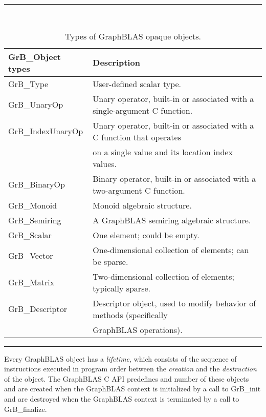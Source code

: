 \begin{table}
\hrule
\begin{center}
\caption{Types of GraphBLAS opaque objects.}
\label{Tab:ObjTypes}
~\\
\begin{tabular}{l|l}
{\sf GrB\_Object types} & Description \\
\hline
{\sf GrB\_Type}           & User-defined scalar type.     \\ \hline
{\sf GrB\_UnaryOp}        & Unary operator, built-in or associated with a single-argument C function.     \\
{\sf GrB\_IndexUnaryOp}   & Unary operator, built-in or associated with a C function that operates \\
                          & on a single value and its location index values.     \\
{\sf GrB\_BinaryOp}       & Binary operator, built-in or associated with a two-argument C function.     \\
{\sf GrB\_Monoid}         & Monoid algebraic structure.     \\
{\sf GrB\_Semiring}       & A GraphBLAS semiring algebraic structure. \\ \hline
{\sf GrB\_Scalar}         & One element; could be empty. \\ 
{\sf GrB\_Vector}         & One-dimensional collection of elements; can be sparse.     \\
{\sf GrB\_Matrix}         & Two-dimensional collection of elements; typically sparse.    \\ \hline
{\sf GrB\_Descriptor}     & Descriptor object, used to modify behavior of methods (specifically \\
                          & GraphBLAS operations).     \\
\end{tabular}
\end{center}
\hrule
\end{table}

Every GraphBLAS object has a \emph{lifetime}, which consists of
the sequence of instructions executed in program order between the
\emph{creation} and the \emph{destruction} of the object.  The GraphBLAS C
API predefines and number of these objects and are created
when the GraphBLAS context is initialized by a call to {\sf GrB\_init}
and are destroyed when the GraphBLAS context is terminated by a call to
{\sf GrB\_finalize}.

